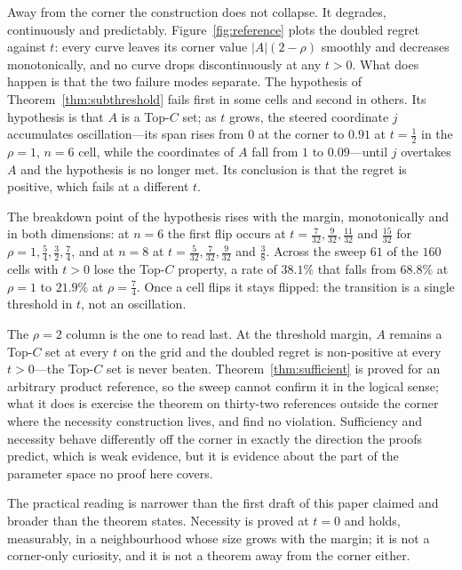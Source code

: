 Away from the corner the construction does not collapse. It degrades, continuously and
predictably. Figure~\ref{fig:reference} plots the doubled regret against $t$: every curve
leaves its corner value $|A|(2-\rho)$ smoothly and decreases monotonically, and no curve
drops discontinuously at any $t>0$. What does happen is that the two failure modes separate.
The hypothesis of Theorem~\ref{thm:subthreshold} fails first in some cells and second in
others. Its hypothesis is that $A$ is a Top-$C$ set; as $t$ grows, the steered coordinate $j$
accumulates oscillation---its span rises from $0$ at the corner to $0.91$ at $t=\tfrac12$ in
the $\rho=1$, $n=6$ cell, while the coordinates of $A$ fall from $1$ to $0.09$---until $j$
overtakes $A$ and the hypothesis is no longer met. Its conclusion is that the regret is
positive, which fails at a different $t$.

The breakdown point of the hypothesis rises with the margin, monotonically and in both
dimensions: at $n=6$ the first flip occurs at $t=\tfrac{7}{32},\tfrac{9}{32},\tfrac{11}{32}$
and $\tfrac{15}{32}$ for $\rho=1,\tfrac54,\tfrac32,\tfrac74$, and at $n=8$ at
$t=\tfrac{5}{32},\tfrac{7}{32},\tfrac{9}{32}$ and $\tfrac38$. Across the sweep $61$ of the
$160$ cells with $t>0$ lose the Top-$C$ property, a rate of $38.1\%$ that falls from $68.8\%$
at $\rho=1$ to $21.9\%$ at $\rho=\tfrac74$. Once a cell flips it stays flipped: the
transition is a single threshold in $t$, not an oscillation. \NUM{}

The $\rho=2$ column is the one to read last. At the threshold margin, $A$ remains a Top-$C$
set at every $t$ on the grid and the doubled regret is non-positive at every $t>0$---the
Top-$C$ set is never beaten. Theorem~\ref{thm:sufficient} is proved for an arbitrary product
reference, so the sweep cannot confirm it in the logical sense; what it does is exercise the
theorem on thirty-two references outside the corner where the necessity construction lives,
and find no violation. Sufficiency and necessity behave differently off the corner in exactly
the direction the proofs predict, which is weak evidence, but it is evidence about the part of
the parameter space no proof here covers.

The practical reading is narrower than the first draft of this paper claimed and broader than
the theorem states. Necessity is proved at $t=0$ and holds, measurably, in a neighbourhood
whose size grows with the margin; it is not a corner-only curiosity, and it is not a theorem
away from the corner either.

